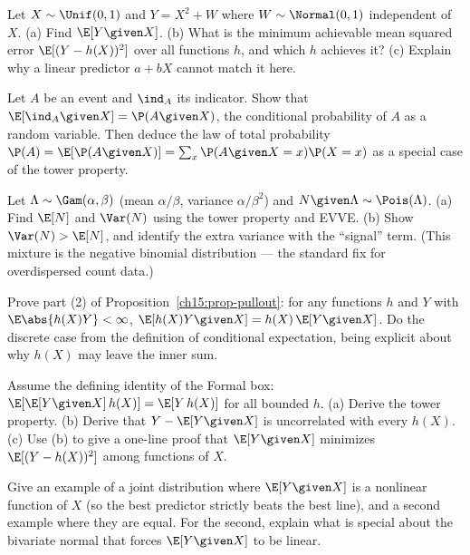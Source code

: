 \begin{exercise}
\label{ch15:exr-best}
Let $X \sim \Unif(0,1)$ and $Y = X^2 + W$ where $W \sim \Normal(0, 1)$ independent of $X$. (a) Find
$\E[Y\given X]$. (b) What is the minimum achievable mean squared error $\E[(Y - h(X))^2]$ over all
functions $h$, and which $h$ achieves it? (c) Explain why a linear predictor $a + bX$ cannot match it
here.
\end{exercise}

\begin{exercise}
\label{ch15:exr-indicator}
Let $A$ be an event and $\ind_A$ its indicator. Show that $\E[\ind_A \given X] = \P(A \given X)$, the
conditional probability of $A$ as a random variable. Then deduce the law of total probability
$\P(A) = \E[\P(A\given X)] = \sum_x \P(A\given X=x)\P(X=x)$ as a special case of the tower property.
\end{exercise}

\begin{exercise}[Overdispersion]
\label{ch15:exr-overdispersion}
Let $\Lambda \sim \Gam(\alpha, \beta)$ (mean $\alpha/\beta$, variance $\alpha/\beta^2$) and
$N\given\Lambda \sim \Pois(\Lambda)$. (a) Find $\E[N]$ and $\Var(N)$ using the tower property and EVVE.
(b) Show $\Var(N) > \E[N]$, and identify the extra variance with the ``signal'' term. (This mixture is
the negative binomial distribution --- the standard fix for overdispersed count data.)
\end{exercise}

\begin{exercise}
\label{ch15:exr-proof-pullout}
Prove part (2) of Proposition~\ref{ch15:prop-pullout}: for any functions $h$ and $Y$ with
$\E\abs{h(X)Y} < \infty$, $\E[h(X)Y \given X] = h(X)\,\E[Y\given X]$. Do the discrete case from the
definition of conditional expectation, being explicit about why $h(X)$ may leave the inner sum.
\end{exercise}

\begin{exercise}
\label{ch15:exr-proof-defining}
Assume the defining identity of the Formal box: $\E[\E[Y\given X]\,h(X)] = \E[Y\,h(X)]$ for all bounded
$h$. (a) Derive the tower property. (b) Derive that $Y - \E[Y\given X]$ is uncorrelated with every
$h(X)$. (c) Use (b) to give a one-line proof that $\E[Y\given X]$ minimizes
$\E[(Y - h(X))^2]$ among functions of $X$.
\end{exercise}

\begin{exercise}
\label{ch15:exr-conceptual}
Give an example of a joint distribution where $\E[Y\given X]$ is a nonlinear function of $X$ (so the
best predictor strictly beats the best line), and a second example where they are equal. For the second,
explain what is special about the bivariate normal that forces $\E[Y\given X]$ to be linear.
\end{exercise}
